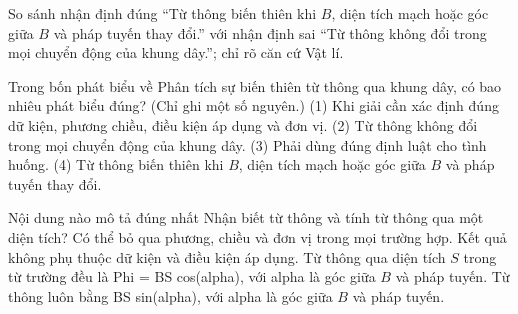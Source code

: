 \begin{bt}
So sánh nhận định đúng “Từ thông biến thiên khi $B$, diện tích mạch hoặc góc giữa $B$ và pháp tuyến thay đổi.” với nhận định sai “Từ thông không đổi trong mọi chuyển động của khung dây.”; chỉ rõ căn cứ Vật lí.
\end{bt}

\begin{ex}
Trong bốn phát biểu về Phân tích sự biến thiên từ thông qua khung dây, có bao nhiêu phát biểu đúng? (Chỉ ghi một số nguyên.) (1) Khi giải cần xác định đúng dữ kiện, phương chiều, điều kiện áp dụng và đơn vị. (2) Từ thông không đổi trong mọi chuyển động của khung dây. (3) Phải dùng đúng định luật cho tình huống. (4) Từ thông biến thiên khi $B$, diện tích mạch hoặc góc giữa $B$ và pháp tuyến thay đổi.
\end{ex}

\begin{ex}
Nội dung nào mô tả đúng nhất Nhận biết từ thông và tính từ thông qua một diện tích?
\choice
{Có thể bỏ qua phương, chiều và đơn vị trong mọi trường hợp.}
{Kết quả không phụ thuộc dữ kiện và điều kiện áp dụng.}
{\True Từ thông qua diện tích $S$ trong từ trường đều là Phi = BS cos(alpha), với alpha là góc giữa $B$ và pháp tuyến.}
{Từ thông luôn bằng BS sin(alpha), với alpha là góc giữa $B$ và pháp tuyến.}
\end{ex}

